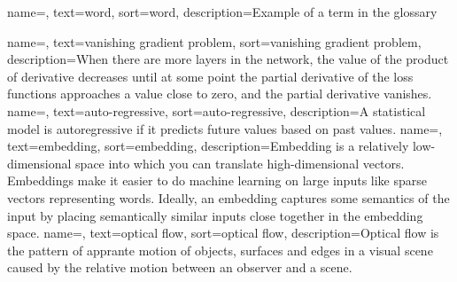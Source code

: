 


{
    name=,
    text=word,
    sort=word,
    description={Example of a term in the glossary}
}

{
    name=,
    text=vanishing gradient problem,
    sort=vanishing gradient problem,
    description={When there are more layers in the network, the value of the product of derivative decreases until at some point the partial derivative of the loss functions approaches a value close to zero, and the partial derivative vanishes.}
}
{
    name=,
    text=auto-regressive,
    sort=auto-regressive,
    description={A statistical  model is autoregressive if it predicts future values based on past values.}
}
{
    name=,
    text=embedding,
    sort=embedding,
    description={Embedding is a relatively low-dimensional space into which you can translate high-dimensional vectors. Embeddings make it easier to do machine learning on large inputs like sparse vectors representing words. Ideally, an embedding captures some semantics of the input by placing semantically similar inputs close together in the embedding space.}
}
{
    name=,
    text=optical flow,
    sort=optical flow,
    description={Optical flow is the pattern of apprante motion of objects, surfaces and edges in a visual scene caused by the relative motion between an observer and a scene.}
}
